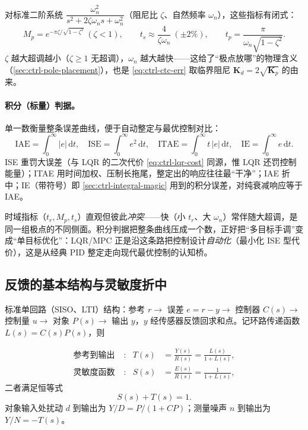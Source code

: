 对标准二阶系统 $\dfrac{\omega_n^2}{s^2+2\zeta\omega_n s+\omega_n^2}$（阻尼比 $\zeta$、自然频率 $\omega_n$），这些指标有闭式\cite{astrom2008feedback}：
\begin{equation}
  M_p=e^{-\pi\zeta/\sqrt{1-\zeta^2}}\ (\zeta<1),\qquad t_s\approx\frac{4}{\zeta\omega_n}\ (\pm2\%),\qquad t_p=\frac{\pi}{\omega_n\sqrt{1-\zeta^2}}.
  \label{eq:ctrl-2nd-order-spec}
\end{equation}
$\zeta$ 越大超调越小（$\zeta\ge1$ 无超调），$\omega_n$ 越大越快——这给了“极点放哪”的物理含义（\cref{sec:ctrl-pole-placement}），也是 \cref{eq:ctrl-ctc-err} 取临界阻尼 $\mathbf{K}_d=2\sqrt{\mathbf{K}_p}$ 的由来。

\paragraph{积分（标量）判据。}
单一数衡量整条误差曲线，便于自动整定与最优控制对比\cite{astrom2008feedback}：
\begin{equation}
  \mathrm{IAE}=\int_0^\infty|e|\,\mathrm dt,\quad
  \mathrm{ISE}=\int_0^\infty e^2\,\mathrm dt,\quad
  \mathrm{ITAE}=\int_0^\infty t\,|e|\,\mathrm dt,\quad
  \mathrm{IE}=\int_0^\infty e\,\mathrm dt.
  \label{eq:ctrl-perf-integral}
\end{equation}
ISE 重罚大误差（与 LQR 的二次代价 \cref{eq:ctrl-lqr-cost} 同源，惟 LQR 还罚控制能量）；ITAE 用时间加权、压制长拖尾，整定出的响应往往最“干净”；IAE 折中；IE（带符号）即 \cref{sec:ctrl-integral-magic} 用到的积分误差，对纯衰减响应等于 IAE。

\begin{insight}
时域指标（$t_r,M_p,t_s$）直观但彼此\emph{冲突}——快（小 $t_r$、大 $\omega_n$）常伴随大超调，是同一组极点的不同侧面。积分判据把整条曲线压成一个数，正好把“多目标手调”变成“单目标优化”：LQR/MPC 正是沿这条路把控制设计\emph{自动化}（最小化 ISE 型代价），这是从经典 PID 整定走向现代最优控制的认知桥。
\end{insight}

\subsection{反馈的基本结构与灵敏度折中}
\label{sec:ctrl-feedback-struct}

标准单回路（SISO、LTI）结构：参考 $r\to$ 误差 $e=r-y\to$ 控制器 $C(s)\to$ 控制量 $u\to$ 对象 $P(s)\to$ 输出 $y$，$y$ 经传感器反馈回求和点\cite{astrom2008feedback}。记环路传递函数 $L(s)=C(s)P(s)$，则

\begin{align}
  \text{参考到输出}\;&: & T(s)&=\frac{Y(s)}{R(s)}=\frac{L(s)}{1+L(s)},\label{eq:ctrl-comp-sens}\\
  \text{灵敏度函数}\;&: & S(s)&=\frac{E(s)}{R(s)}=\frac{1}{1+L(s)},\label{eq:ctrl-sens}
\end{align}
二者满足恒等式
\begin{equation}
  S(s)+T(s)=1.
  \label{eq:ctrl-S-plus-T}
\end{equation}
对象输入处扰动 $d$ 到输出为 $Y/D=P/(1+CP)$；测量噪声 $n$ 到输出为 $Y/N=-T(s)$。

